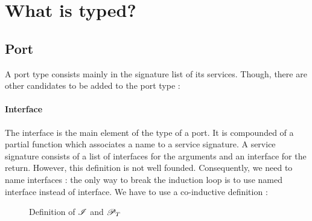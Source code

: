 \section{What is typed?}

\subsection{Port}
A port type consists mainly in the signature list of its services. Though, there are other candidates to be added to the port type : 

\paragraph{Interface}
The interface is the main element of the type of a port. It is compounded of a partial function which associates a name to a service signature. A service signature consists of a list of interfaces for the arguments and an interface for the return. However, this definition is not well founded. Consequently, we need to name interfaces : the only way to break the induction loop is to use named interface instead of interface. We have to use a co-inductive definition :

\begin{figure}[ht!]
\caption{Definition of $\mathcal{I}$ and $\mathcal{P}_T$}
\end{figure}


